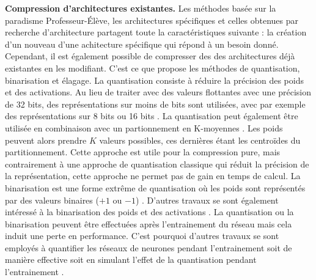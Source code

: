 \noindent \textbf{Compression d'architectures existantes.} Les méthodes basée
sur la paradisme Professeur-Élève, les architectures spécifiques et celles
obtenues par recherche d'architecture  partagent toute la caractéristiques
suivante : la création d'un nouveau d'une achitecture spécifique qui répond à un
besoin donné. Cependant, il est également possible de compresser des des
architectures déjà existantes en les modifiant. C'est ce que propose les
méthodes de quantisation, binarisation et élagage.  La quantisation consiste à
réduire la précision des poids et des activations. Au lieu de traiter avec des
valeurs flottantes avec une précision de 32 bits, des représentations sur moins
de bits sont utilisées, avec par exemple des représentations sur 8 bits
\cite{37631} ou 16 bits \cite{gupta2015deep}. La quantisation peut également
être utilisée en combinaison avec un partionnement en K-moyennes
\cite{DBLP:journals/corr/HanMD15}. Les poids peuvent alors prendre $K$ valeurs
possibles, ces dernières étant les centroïdes du partitionnement. Cette approche
est utile pour la compression pure, mais contrairement à une approche de
quantisation classique qui réduit la précision de la représentation, cette
approche ne permet pas de gain en temps de calcul. La binarisation est une forme
extrême de quantisation où les poids sont représentés par des valeurs binaires
($+1$ ou $-1$) \cite{courbariaux2015binaryconnect}. D'autres travaux se sont
également intéressé à la binarisation des poids et des activations
\cite{DBLP:conf/nips/HubaraCSEB16}. La quantisation ou la binarisation peuvent
être effectuées après l'entrainement du réseau
\cite{tensorrt,DBLP:journals/corr/HanMD15} mais cela induit une perte en
performance. C'est pourquoi d'autres travaux se sont employés à quantifier les
réseaux de neurones pendant l'entrainement soit de manière effective
\cite{courbariaux2015binaryconnect,DBLP:conf/nips/HubaraCSEB16} soit en simulant
l'effet de la quantisation pendant l'entrainement
\cite{DBLP:conf/cvpr/JacobKCZTHAK18}.\\

